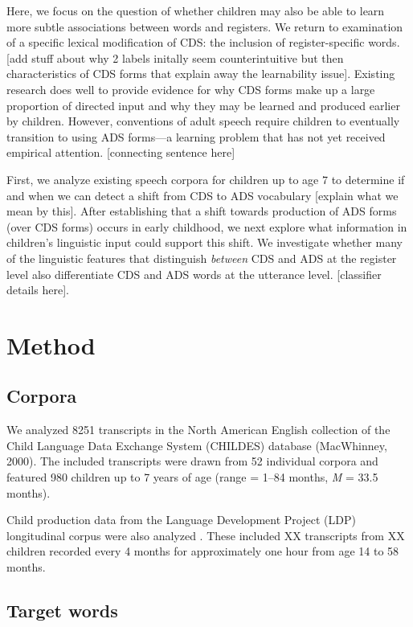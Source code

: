 \documentclass[10pt, letterpaper]{article}
\begin{document}
Here, we focus on the question of whether children may also be able to
learn more subtle associations between words and registers. We return to
examination of a specific lexical modification of CDS: the inclusion of
register-specific words. {[}add stuff about why 2 labels initally seem
counterintuitive but then characteristics of CDS forms that explain away
the learnability issue{]}. Existing research does well to provide
evidence for why CDS forms make up a large proportion of directed input
and why they may be learned and produced earlier by children. However,
conventions of adult speech require children to eventually transition to
using ADS forms---a learning problem that has not yet received empirical
attention. {[}connecting sentence here{]}

First, we analyze existing speech corpora for children up to age 7 to
determine if and when we can detect a shift from CDS to ADS vocabulary
{[}explain what we mean by this{]}. After establishing that a shift
towards production of ADS forms (over CDS forms) occurs in early
childhood, we next explore what information in children's linguistic
input could support this shift. We investigate whether many of the
linguistic features that distinguish \emph{between} CDS and ADS at the
register level also differentiate CDS and ADS words at the utterance
level. {[}classifier details here{]}.

\hypertarget{method}{%
\section{Method}\label{method}}

\hypertarget{corpora}{%
\subsection{Corpora}\label{corpora}}

We analyzed 8251 transcripts in the North American English collection of
the Child Language Data Exchange System (CHILDES) database (MacWhinney,
2000). The included transcripts were drawn from 52 individual corpora
and featured 980 children up to 7 years of age (range = 1--84 months,
\emph{M} = 33.5 months).

Child production data from the Language Development Project (LDP)
longitudinal corpus were also analyzed . These included XX transcripts
from XX children recorded every 4 months for approximately one hour from
age 14 to 58 months.

\hypertarget{target-words}{%
\subsection{Target words}\label{target-words}}
\end{document}
